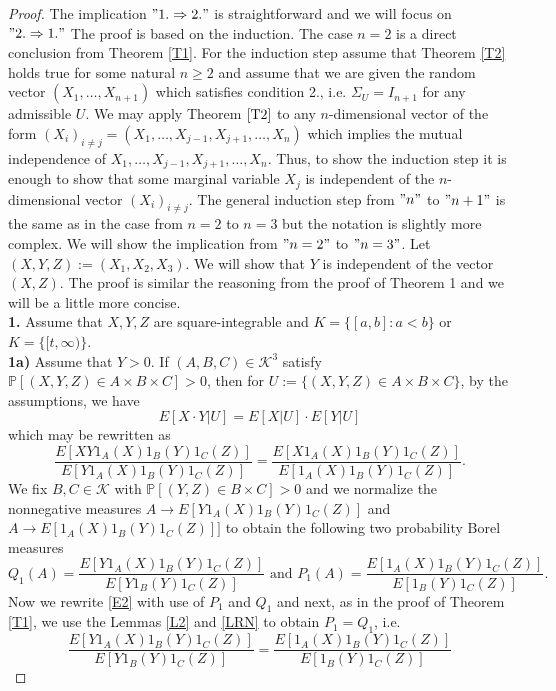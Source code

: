 \documentclass[sn-mathphys,Numbered,11pt]{sn-jnl}%
\theoremstyle{thmstyleone}%
\newcommand{\PP}{\mathbb{P}}
\newcommand{\KK}{\mathcal{K}}
\begin{document}
\begin{proof}
The implication $"1.\Rightarrow 2."$ is straightforward and we will focus on $"2.\Rightarrow 1."$ The proof is based on the induction. The case $n=2$ is a direct conclusion from  Theorem \ref{T1}.  For the induction step assume that Theorem \ref{T2} holds true for some natural $n\geq 2$ and assume that we are given the random vector $(X_1,\dots,X_{n+1})$ which satisfies condition 2., i.e. $\Sigma_U=I_{n+1}$ for any admissible $U$.  We may  apply Theorem $\ref{T2}$ to any $n$-dimensional vector of the form $(X_i)_{i\neq j}=(X_1,\dots,X_{j-1},X_{j+1},\dots,X_n)$ which implies  the mutual independence of  $X_1,\dots,X_{j-1},X_{j+1},\dots,X_n$. Thus, to show the induction step it is enough to show that some marginal variable $X_j$ is independent of the $n$-dimensional vector $(X_i)_{i\neq j}$. The general  induction step from $"n"$ to $"n+1"$ is the same as in the case from $n=2$ to $n=3$ but the notation is slightly more complex. We will show the implication from  $"n=2"$ to $"n=3"$.  Let $(X,Y,Z):=(X_1,X_2,X_3)$. We will show that $Y$ is independent of the vector $(X,Z)$. The proof is similar the reasoning from the proof of Theorem 1 and we will be a little more concise.\\
\textbf{1.} Assume that $X,Y,Z$ are square-integrable and $K=\{[a,b]\colon a<b\}$ or $K=\{[t,\infty)\}$. \\
\textbf{1a)} Assume that $Y>0$.  If $(A,B,C)\in \KK^3$ satisfy $\PP[(X,Y,Z)\in A\times B\times C]>0$, then for $U:=\{(X,Y,Z)\in A\times B\times C\}$,  by the assumptions, we have
$$E[X\cdot Y|U]=E[X|U]\cdot E[Y|U]$$
which may be rewritten as
\begin{equation}\label{E2}\frac{E[XY1_A(X)1_B(Y)1_C(Z)]}{E[Y1_A(X)1_B(Y)1_C(Z)]}=\frac{E[X1_A(X)1_B(Y)1_C(Z)]}{E[1_A(X)1_B(Y)1_C(Z)]}.
\end{equation}
We fix $B,C\in\KK$ with $\PP[(Y,Z)\in  B\times C]>0$ and we normalize the nonnegative measures $A\to E[Y1_A(X)1_B(Y)1_C(Z)]$ and  $A\to E[1_A(X)1_B(Y)1_C(Z)]]$ to obtain the following two probability Borel measures
$$Q_1(A)=\frac{E[Y1_A(X)1_B(Y)1_C(Z)]}{E[Y1_B(Y)1_C(Z)]}\mbox{ and } P_1(A)=\frac{E[1_A(X)1_B(Y)1_C(Z)]}{E[1_B(Y)1_C(Z)]}.$$
Now we rewrite \eqref{E2} with use of $P_1$ and $Q_1$ and next, as in the proof of Theorem \ref{T1}, we use the Lemmas \ref{L2} and \ref{LRN}  to obtain $P_1=Q_1$, i.e.
\begin{equation}\label{EEEE}\frac{E[Y1_A(X)1_B(Y)1_C(Z)]}{E[Y1_B(Y)1_C(Z)]}=\frac{E[1_A(X)1_B(Y)1_C(Z)]}{E[1_B(Y)1_C(Z)]}
\end{equation}

\end{proof}
\end{document}

